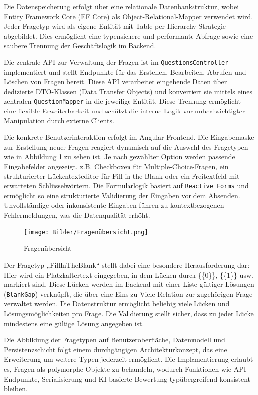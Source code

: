 \documentclass[a4paper,12pt]{article}
\begin{document}
Die Datenspeicherung erfolgt über eine relationale Datenbankstruktur, wobei Entity Framework Core (EF Core) als Object-Relational-Mapper verwendet wird. Jeder Fragetyp wird als eigene Entität mit Table-per-Hierarchy-Strategie abgebildet. Dies ermöglicht eine typensichere und performante Abfrage sowie eine saubere Trennung der Geschäftslogik im Backend.

Die zentrale API zur Verwaltung der Fragen ist im \texttt{QuestionsController} implementiert und stellt Endpunkte für das Erstellen, Bearbeiten, Abrufen und Löschen von Fragen bereit. Diese API verarbeitet eingehende Daten über dedizierte DTO-Klassen (Data Transfer Objects) und konvertiert sie mittels eines zentralen \texttt{QuestionMapper} in die jeweilige Entität. Diese Trennung ermöglicht eine flexible Erweiterbarkeit und schützt die interne Logik vor unbeabsichtigter Manipulation durch externe Clients.

Die konkrete Benutzerinteraktion erfolgt im Angular-Frontend. Die Eingabemaske zur Erstellung neuer Fragen reagiert dynamisch auf die Auswahl des Fragetypen wie in Abbildung \ref{fig:Fragenübersicht} zu sehen ist. Je nach gewählter Option werden passende Eingabefelder angezeigt, z.B. Checkboxen für Multiple-Choice-Fragen, ein strukturierter Lückentexteditor für Fill-in-the-Blank oder ein Freitextfeld mit erwarteten Schlüsselwörtern. Die Formularlogik basiert auf \texttt{Reactive Forms} und ermöglicht so eine strukturierte Validierung der Eingaben vor dem Absenden. Unvollständige oder inkonsistente Eingaben führen zu kontextbezogenen Fehlermeldungen, was die Datenqualität erhöht.

\begin{figure}[H]
    \centering
    \texttt{[image: Bilder/Fragenübersicht.png]}
    \caption{Fragenübersicht}
    \label{fig:Fragenübersicht}
\end{figure}

Der Fragetyp „FillInTheBlank“ stellt dabei eine besondere Herausforderung dar: Hier wird ein Platzhaltertext eingegeben, in dem Lücken durch \{\{0\}\}, \{\{1\}\} usw. markiert sind. Diese Lücken werden im Backend mit einer Liste gültiger Lösungen (\texttt{BlankGap}) verknüpft, die über eine Eins-zu-Viele-Relation zur zugehörigen Frage verwaltet werden. Die Datenstruktur ermöglicht beliebig viele Lücken und Lösungsmöglichkeiten pro Frage. Die Validierung stellt sicher, dass zu jeder Lücke mindestens eine gültige Lösung angegeben ist.

Die Abbildung der Fragetypen auf Benutzeroberfläche, Datenmodell und Persistenzschicht folgt einem durchgängigen Architekturkonzept, das eine Erweiterung um weitere Typen jederzeit ermöglicht. Die Implementierung erlaubt es, Fragen als polymorphe Objekte zu behandeln, wodurch Funktionen wie API-Endpunkte, Serialisierung und KI-basierte Bewertung typübergreifend konsistent bleiben.
\end{document}

